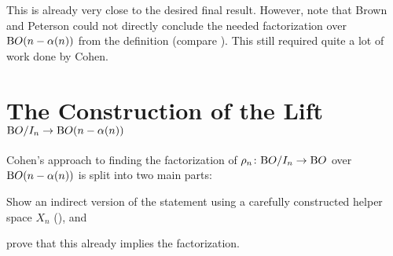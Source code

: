 This is already very close to the desired final result.
However, note that Brown and Peterson could not directly conclude the
needed factorization over $\mathrm{B}O(n-\alpha(n))$ from the definition
(compare \cite{brownpeterson}).
This still required quite a lot of work done by Cohen.


\section*{The Construction of the Lift $\mathrm{B}O/I_{n}\to\mathrm{B}O(n-\alpha(n))$}
Cohen's approach to finding the factorization of
$\rho_n\colon\mathrm{B}O/I_{n}\to\mathrm{B}O$ over $\mathrm{B}O(n-\alpha(n))$ is split into two
main parts:
\begin{compactitemize}
\item Show an indirect version of the statement using a carefully
  constructed helper space $X_n$ (\cite[Lemma~B]{cohen}), and
\item prove that this already implies the factorization.
\end{compactitemize}

